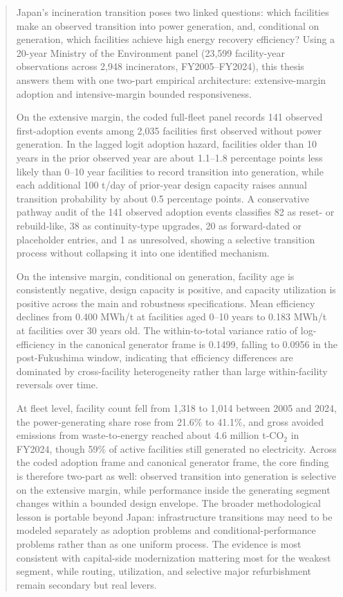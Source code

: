 \documentclass[12pt,a4paper]{article}
\begin{document}
\begin{abstract}
Japan's incineration transition poses two linked questions: which facilities make an observed transition into power generation, and, conditional on generation, which facilities achieve high energy recovery efficiency? Using a 20-year Ministry of the Environment panel (23,599 facility-year observations across 2,948 incinerators, FY2005--FY2024), this thesis answers them with one two-part empirical architecture: extensive-margin adoption and intensive-margin bounded responsiveness.

On the extensive margin, the coded full-fleet panel records 141 observed first-adoption events among 2,035 facilities first observed without power generation. In the lagged logit adoption hazard, facilities older than 10 years in the prior observed year are about 1.1--1.8 percentage points less likely than 0--10 year facilities to record transition into generation, while each additional 100 t/day of prior-year design capacity raises annual transition probability by about 0.5 percentage points. A conservative pathway audit of the 141 observed adoption events classifies 82 as reset- or rebuild-like, 38 as continuity-type upgrades, 20 as forward-dated or placeholder entries, and 1 as unresolved, showing a selective transition process without collapsing it into one identified mechanism.

On the intensive margin, conditional on generation, facility age is consistently negative, design capacity is positive, and capacity utilization is positive across the main and robustness specifications. Mean efficiency declines from 0.400 MWh/t at facilities aged 0--10 years to 0.183 MWh/t at facilities over 30 years old. The within-to-total variance ratio of log-efficiency in the canonical generator frame is 0.1499, falling to 0.0956 in the post-Fukushima window, indicating that efficiency differences are dominated by cross-facility heterogeneity rather than large within-facility reversals over time.

At fleet level, facility count fell from 1,318 to 1,014 between 2005 and 2024, the power-generating share rose from 21.6\% to 41.1\%, and gross avoided emissions from waste-to-energy reached about 4.6 million t-CO$_2$ in FY2024, though 59\% of active facilities still generated no electricity. Across the coded adoption frame and canonical generator frame, the core finding is therefore two-part as well: observed transition into generation is selective on the extensive margin, while performance inside the generating segment changes within a bounded design envelope. The broader methodological lesson is portable beyond Japan: infrastructure transitions may need to be modeled separately as adoption problems and conditional-performance problems rather than as one uniform process. The evidence is most consistent with capital-side modernization mattering most for the weakest segment, while routing, utilization, and selective major refurbishment remain secondary but real levers.
\end{abstract}
\end{document}
